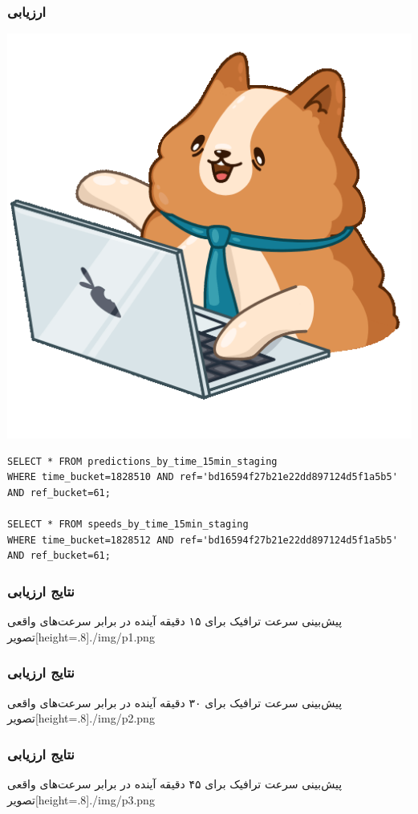 \documentclass{beamer}
\begin{document}
\begin{frame}[fragile]
  \frametitle{ارزیابی}
  \includegraphics[height=.5\textheight]{./img/bernard.png}
  \scriptsize
  \begin{latin}
    \begin{verbatim}
SELECT * FROM predictions_by_time_15min_staging
WHERE time_bucket=1828510 AND ref='bd16594f27b21e22dd897124d5f1a5b5'
AND ref_bucket=61;

SELECT * FROM speeds_by_time_15min_staging
WHERE time_bucket=1828512 AND ref='bd16594f27b21e22dd897124d5f1a5b5'
AND ref_bucket=61;
    \end{verbatim}
  \end{latin}
\end{frame}

\begin{frame}
  \frametitle{نتایج ارزیابی}
  پیش‌بینی سرعت ترافیک برای ۱۵ دقیقه آینده در برابر سرعت‌های واقعی
  ‌تصویر[height=.8\textheight]{./img/p1.png}
\end{frame}

\begin{frame}
  \frametitle{نتایج ارزیابی}
  پیش‌بینی سرعت ترافیک برای ۳۰ دقیقه آینده در برابر سرعت‌های واقعی
  ‌تصویر[height=.8\textheight]{./img/p2.png}
\end{frame}

\begin{frame}
  \frametitle{نتایج ارزیابی}
  پیش‌بینی سرعت ترافیک برای ۴۵ دقیقه آینده در برابر سرعت‌های واقعی
  ‌تصویر[height=.8\textheight]{./img/p3.png}
\end{frame}
\end{document}
